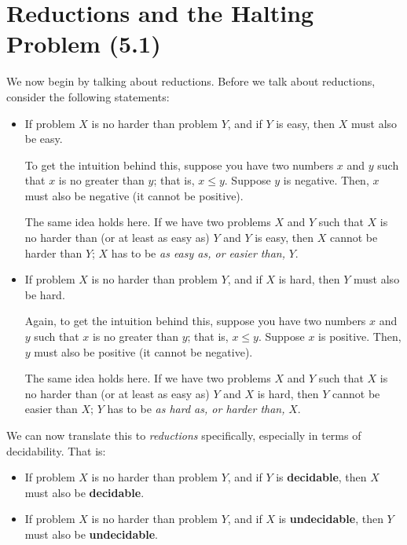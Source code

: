\documentclass[letterpaper]{article}
\begin{document}
\section{Reductions and the Halting Problem (5.1)}
We now begin by talking about reductions. Before we talk about reductions, consider the following statements: 
\begin{itemize}
    \item If problem $X$ is no harder than problem $Y$, and if $Y$ is easy, then $X$ must also be easy. 
    \begin{mdframed}[]
        To get the intuition behind this, suppose you have two numbers $x$ and $y$ such that $x$ is no greater than $y$; that is, $x \leq y$. Suppose $y$ is negative. Then, $x$ must also be negative (it cannot be positive). 

        \bigskip 

        The same idea holds here. If we have two problems $X$ and $Y$ such that $X$ is no harder than (or at least as easy as) $Y$ and $Y$ is easy, then $X$ cannot be harder than $Y$; $X$ has to be \emph{as easy as, or easier than,} $Y$. 
    \end{mdframed}
    \item If problem $X$ is no harder than problem $Y$, and if $X$ is hard, then $Y$ must also be hard. 
    \begin{mdframed}[]
        Again, to get the intuition behind this, suppose you have two numbers $x$ and $y$ such that $x$ is no greater than $y$; that is, $x \leq y$. Suppose $x$ is positive. Then, $y$ must also be positive (it cannot be negative). 

        \bigskip 

        The same idea holds here. If we have two problems $X$ and $Y$ such that $X$ is no harder than (or at least as easy as) $Y$ and $X$ is hard, then $Y$ cannot be easier than $X$; $Y$ has to be \emph{as hard as, or harder than,} $X$. 
    \end{mdframed}
\end{itemize}
We can now translate this to \emph{reductions} specifically, especially in terms of decidability. That is: 
\begin{itemize}
    \item If problem $X$ is no harder than problem $Y$, and if $Y$ is \textbf{decidable}, then $X$ must also be \textbf{decidable}. 
    \item If problem $X$ is no harder than problem $Y$, and if $X$ is \textbf{undecidable}, then $Y$ must also be \textbf{undecidable}. 
\end{itemize}
\end{document}
